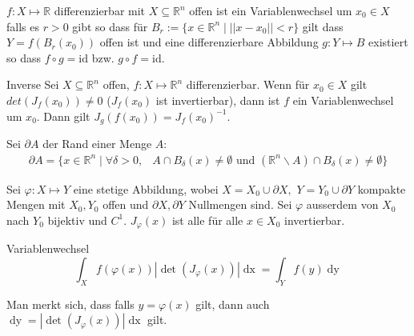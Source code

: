 \documentclass[a4paper,10pt]{article}
\def\R{\mathbb{R}}
\def\dx{\mathop{dx}}
\def\dy{\mathop{dy}}
\begin{document}
$f: X \mapsto \R$ differenzierbar mit $X \subseteq \R^n$ offen ist ein Variablenwechsel um $x_0 \in X$ falls es $r > 0$ gibt so dass für $B_r := \{x \in \R^n \mid ||x-x_0|| < r \}$ gilt dass $Y = f(B_r(x_0))$ offen ist und eine differenzierbare Abbildung $g: Y \mapsto B$ existiert so dass $f \circ g = \mathrm{id}$ bzw. $g \circ f = \mathrm{id}$.

\begin{subbox}{Inverse}
  Sei $X \subseteq \R^n$ offen, $f: X \mapsto \R^n$ differenzierbar. Wenn für $x_0 \in X$ gilt $det(J_f(x_0)) \neq 0$ ($J_f(x_0)$ ist invertierbar), dann ist $f$ ein Variablenwechsel um $x_0$. Dann gilt $J_g(f(x_0)) = J_f(x_0)^{-1}$.
\end{subbox}

Sei \(\partial A\) der Rand einer Menge \(A\):
\begin{align*}
    \partial A = \Big\{ x \in \R^n \mid \forall \delta > 0, &A \cap B_\delta(x) \neq \emptyset \text{ und } (\R^n \backslash A) \cap B_\delta(x) \neq \emptyset \Big\}
\end{align*}

Sei \(\varphi : X \mapsto Y\) eine stetige Abbildung, wobei \(X=  X_0 \cup \partial X, \) \(Y = Y_0 \cup \partial Y\) kompakte Mengen mit \(X_0, Y_0\) offen und \(\partial X, \partial Y\) Nullmengen sind. Sei $\varphi$ ausserdem von $X_0$ nach $Y_0$ bijektiv und $C^1$. $J_\varphi(x)$ ist alle für alle $x \in X_0$ invertierbar.

\begin{mainbox}{Variablenwechsel}
  $$\int_X f(\varphi(x)) | \det(J_\varphi(x)) | \dx = \int_Y f(y) \dy$$
\end{mainbox}

Man merkt sich, dass falls $y = \varphi(x)$ gilt, dann auch $\dy = | \det(J_\varphi(x)) | \dx$ gilt.
\end{document}
